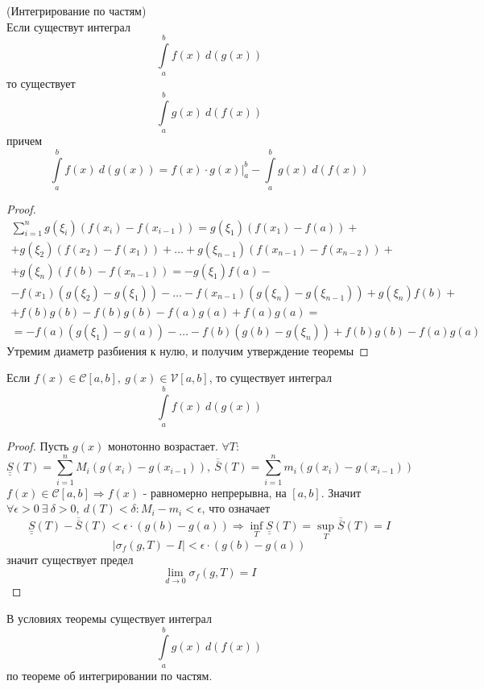 \begin{numtheorem}
    (Интегрирование по частям)\\
    Если существут интеграл
    \[\int\limits_{a}^{b}f(x)\ d(g(x))\]
    то существует
    \[\int\limits_{a}^{b}g(x)\ d(f(x))\]
    причем
    \[\int\limits_{a}^{b}f(x)\ d(g(x))=f(x)\cdot g(x)|_a^b - \int\limits_{a}^{b}g(x)\ d(f(x))\]
\end{numtheorem} 
\begin{proof}
    \begin{multline*}
        \sum\limits_{i=1}^{n}g(\xi_i)(f(x_i)-f(x_{i-1}))=g(\xi_1)(f(x_1)-f(a))+\\+g(\xi_2)(f(x_2)-f(x_1))+\dots+g(\xi_{n-1})(f(x_{n-1})-f(x_{n-2}))+\\+g(\xi_{n})(f(b)-f(x_{n-1}))=-g(\xi_1)f(a)-\\-f(x_1)(g(\xi_2)-g(\xi_1))-\dots-f(x_{n-1})(g(\xi_n)-g(\xi_{n-1}))+g(\xi_n)f(b)+\\
        +f(b)g(b)-f(b)g(b)-f(a)g(a)+f(a)g(a)=\\ %
        =-f(a)(g(\xi_1)-g(a))-\dots-f(b)(g(b)-g(\xi_n))+f(b)g(b)-f(a)g(a)
    \end{multline*}
    Утремим диаметр разбиения к нулю, и получим утверждение теоремы
\end{proof} 
\begin{theorem}
    Если $f(x)\in \mathcal{C}[a,b],\ g(x)\in \mathcal{V}[a,b]$, то существует интеграл
    \[\int\limits_{a}^{b}f(x)\ d(g(x))\]
\end{theorem} 
\begin{proof}
    Пусть $g(x)$ монотонно возрастает. $\forall T:$
    \[\underline{\underline{S}}(T)=\sum\limits_{i=1}^{n}M_i(g(x_i)-g(x_{i-1})),\ \overline{\overline{S}}(T)=\sum\limits_{i=1}^{n}m_i(g(x_i)-g(x_{i-1}))\]
    $f(x)\in \mathcal{C}[a,b] \Rightarrow f(x)$ - равномерно непрерывна, на $[a,b]$. Значит\\
    $\forall \epsilon>0\ \exists\ \delta>0,\ d(T)<\delta: M_i-m_i<\epsilon$, что означает
    \[\underline{\underline{S}}(T)-\overline{\overline{S}}(T)<\epsilon\cdot (g(b)-g(a)) \Rightarrow \inf\limits_T \underline{\underline{S}}(T)=\sup\limits_T \overline{\overline{S}}(T)=I\]
    \[|\sigma_f(g,T)-I|<\epsilon\cdot (g(b)-g(a))\]
    значит существует предел
    \[\lim\limits_{d\to 0}\sigma_f(g,T)=I\]
\end{proof} 
\begin{comm}
    В условиях теоремы существует интеграл
    \[\int\limits_{a}^{b} g(x)\ d(f(x))\]
    по теореме об интегрировании по частям.
\end{comm} 

